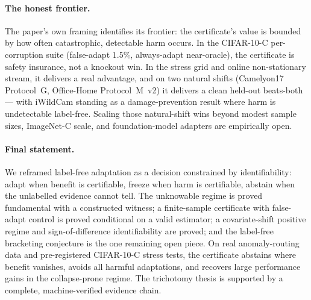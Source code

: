 \paragraph{The honest frontier.}
The paper's own framing identifies its frontier: the certificate's value is
bounded by how often catastrophic, detectable harm occurs.  In the CIFAR-10-C
per-corruption suite (false-adapt $1.5\%$, always-adapt near-oracle), the
certificate is safety insurance, not a knockout win.  In the stress grid and
online non-stationary stream, it delivers a real advantage, and on two natural
shifts (Camelyon17 Protocol~G, Office-Home Protocol~M~v2) it delivers a clean
held-out beats-both --- with iWildCam standing as a damage-prevention result where
harm is undetectable label-free.  Scaling those natural-shift wins beyond modest
sample sizes, ImageNet-C scale, and foundation-model adapters are empirically open.

\paragraph{Final statement.}
We reframed label-free adaptation as a decision constrained by identifiability:
adapt when benefit is certifiable, freeze when harm is certifiable, abstain when
the unlabelled evidence cannot tell.  The unknowable regime is proved fundamental
with a constructed witness; a finite-sample certificate with false-adapt control is
proved conditional on a valid estimator; a covariate-shift positive regime and
sign-of-difference identifiability are proved; and the label-free bracketing
conjecture is the one remaining open piece.  On real anomaly-routing data and
pre-registered CIFAR-10-C stress tests, the certificate abstains where benefit
vanishes, avoids all harmful adaptations, and recovers large performance gains in
the collapse-prone regime.  The trichotomy thesis is supported by a complete,
machine-verified evidence chain.

